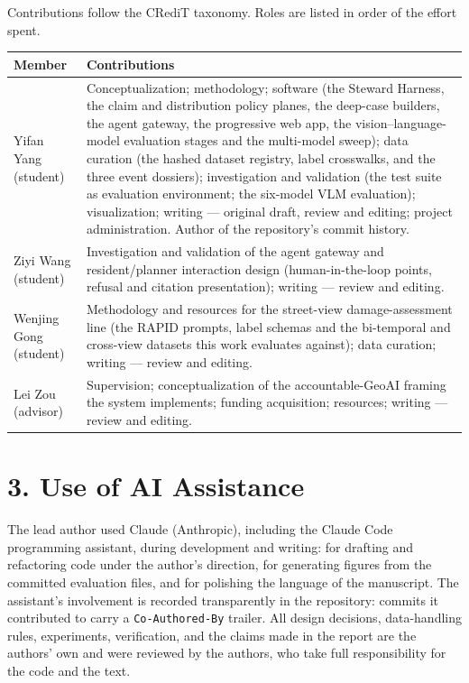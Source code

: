 \documentclass[10pt,letterpaper]{article}
\begin{document}
Contributions follow the CRediT taxonomy. Roles are listed in order of the effort spent.

\begin{center}
\renewcommand{\arraystretch}{1.25}
\begin{tabular}{@{}p{1.35in}p{5.0in}@{}}
\toprule
\textbf{Member} & \textbf{Contributions} \\
\midrule
Yifan Yang (student) &
Conceptualization; methodology; software (the Steward Harness, the claim and distribution policy planes, the deep-case builders, the agent gateway, the progressive web app, the vision--language-model evaluation stages and the multi-model sweep); data curation (the hashed dataset registry, label crosswalks, and the three event dossiers); investigation and validation (the test suite as evaluation environment; the six-model VLM evaluation); visualization; writing --- original draft, review and editing; project administration. Author of the repository's commit history. \\
Ziyi Wang (student) &
Investigation and validation of the agent gateway and resident/planner interaction design (human-in-the-loop points, refusal and citation presentation); writing --- review and editing. \\
Wenjing Gong (student) &
Methodology and resources for the street-view damage-assessment line (the RAPID prompts, label schemas and the bi-temporal and cross-view datasets this work evaluates against); data curation; writing --- review and editing. \\
Lei Zou (advisor) &
Supervision; conceptualization of the accountable-GeoAI framing the system implements; funding acquisition; resources; writing --- review and editing. \\
\bottomrule
\end{tabular}
\end{center}

\section*{3. Use of AI Assistance}

The lead author used Claude (Anthropic), including the Claude Code programming assistant, during development and writing: for drafting and refactoring code under the author's direction, for generating figures from the committed evaluation files, and for polishing the language of the manuscript. The assistant's involvement is recorded transparently in the repository: commits it contributed to carry a \texttt{Co-Authored-By} trailer. All design decisions, data-handling rules, experiments, verification, and the claims made in the report are the authors' own and were reviewed by the authors, who take full responsibility for the code and the text.
\end{document}
